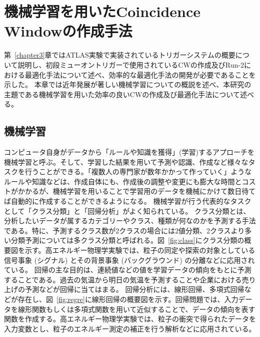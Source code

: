 \chapter{機械学習を用いたCoincidence Windowの作成手法}\label{chapter4}
第~\ref{chapter3}章ではATLAS実験で実装されているトリガーシステムの概要について説明し、初段ミューオントリガーで使用されているCWの作成及びRun-2における最適化手法について述べ、効率的な最適化手法の開発が必要であることを示した。
本章では近年発展が著しい機械学習についての概説を述べ、本研究の主題である機械学習を用いた効率の良いCWの作成及び最適化手法について述べる。

\section{機械学習}\label{回帰分析}
コンピュータ自身がデータから「ルールや知識を獲得」(学習)するアプローチを機械学習と呼ぶ。そして、学習した結果を用いて予測や認識、作成など様々なタスクを行うことができる。「複数人の専門家が数年かかって作っていく」ようなルールや知識などは、作成自体にも、作成後の調整や変更にも膨大な時間とコストがかかるが、機械学習を用いることで学習用のデータを機械にかけて数日待てば自動的に作成することができるようになる\cite{book:DL}。
機械学習が行う代表的なタスクとして「クラス分類」と「回帰分析」がよく知られている。
クラス分類とは、分析したいデータが属するカテゴリーやクラス、種類が何なのかを予測する手法である。特に、予測するクラス数が2クラスの場合には2値分類、2クラスより多い分類予測については多クラス分類と呼ばれる。図~\ref{fig:class}にクラス分類の概要図を示す。高エネルギー物理学実験では、粒子の同定や探索の対象としている信号事象 (シグナル) とその背景事象 (バックグラウンド) の分離などに応用されている。
回帰の主な目的は、連続値などの値を学習データの傾向をもとに予測することである。過去の気温から明日の気温を予測することや企業における売り上げの予測などが回帰に当てはまる。
回帰分析には、線形回帰、多項式回帰などが存在し、図~\ref{fig:regre}に線形回帰の概要図を示す。回帰問題では、入力データを線形関数もしくは多項式関数を用いて近似することで、データの傾向を表す関数を作成する。高エネルギー物理学実験では、粒子の衝突で得られたデータを入力変数とし、粒子のエネルギー測定の補正を行う解析などに応用されている。

